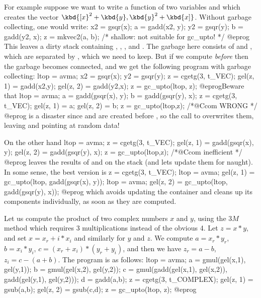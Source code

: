For example suppose we want to write a function of two  variables
 and  which creates the vector $\kbd{[x}^2+\kbd{y},
\kbd{y}^2+\kbd{x]}$. Without garbage collecting, one would write:
%
\bprog
  x2 = gsqr(x); a = gadd(x2, y);
  y2 = gsqr(y); b = gadd(y2, x);
  z = mkvec2(a, b);  /* shallow: not suitable for gc_upto! */
@eprog\noindent
This leaves a dirty stack containing , ,
,  and . The garbage here consists of  and
, which are separated by , which we need to keep. But if we
compute  \emph{before}  then the garbage becomes connected,
and we get the following program with garbage collecting:
%
\bprog
  ltop = avma; x2 = gsqr(x); y2 = gsqr(y);
  z = cgetg(3, t_VEC);
  gel(z, 1) = gadd(x2,y);
  gel(z, 2) = gadd(y2,x); z = gc_upto(ltop, z);
@eprog\noindent Beware that
\bprog
  ltop = avma; a = gadd(gsqr(x), y); b = gadd(gsqr(y), x);
  z = cgetg(3, t_VEC);
  gel(z, 1) = a;
  gel(z, 2) = b; z = gc_upto(ltop,z); /*@Ccom WRONG */
@eprog\noindent
is a disaster since  and  are created before
, so the call to  overwrites them, leaving
 and  pointing at random data!

On the other hand
\bprog
  ltop = avma; z = cgetg(3, t_VEC);
  gel(z, 1) = gadd(gsqr(x), y);
  gel(z, 2) = gadd(gsqr(y), x); z = gc_upto(ltop,z); /*@Ccom inefficient */
@eprog\noindent
leaves the results of  and  on the stack (and
lets  update them for naught). In some sense, the best
version is
\bprog
  z = cgetg(3, t_VEC);
  ltop = avma; gel(z, 1) = gc_upto(ltop, gadd(gsqr(x), y));
  ltop = avma; gel(z, 2) = gc_upto(ltop, gadd(gsqr(y), x));
@eprog\noindent
which avoids updating the container  and cleans up its components
individually, as soon as they are computed.

 Let us compute the product of two complex
numbers $x$ and $y$, using the $3M$ method which requires 3 multiplications
instead of the obvious 4. Let $z = x*y$, and set $x = x_r + i*x_i$ and
similarly for $y$ and $z$. We compute $a = x_r*y_r$, $b=x_i*y_i$,
$c=(x_r+x_i)*(y_r+y_i)$, and then we have $z_r=a-b$,
$z_i=c-(a+b)$. The program is as follows:
%
\bprog
ltop = avma;
a = gmul(gel(x,1), gel(y,1));
b = gmul(gel(x,2), gel(y,2));
c = gmul(gadd(gel(x,1), gel(x,2)), gadd(gel(y,1), gel(y,2)));
d = gadd(a,b); z = cgetg(3, t_COMPLEX);
gel(z, 1) = gsub(a,b);
gel(z, 2) = gsub(c,d); z = gc_upto(ltop, z);
@eprog

